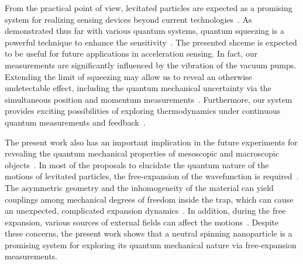 \documentclass[aps, prl, 
amsmath, showpacs, preprintnumbers, twocolumn, amssymb, amsmath, superscriptaddress]{revtex4-1}
\begin{document}
From the practical point of view, levitated particles are expected as a promising system for realizing sensing devices beyond current technologies~\cite{monteiro2020force}. As demonstrated thus far with various quantum systems, quantum squeezing is a powerful technique to enhance the sensitivity~\cite{ma2011quantum,toth2014quantum,braun2018quantum,barzanjeh2022optomechanics}. The presented shceme is expected to be useful for future applications in acceleration sensing. In fact, our measurements are significantly influenced by the vibration of the vacuum pumps. Extending the limit of squeezing may allow us to reveal an otherwise undetectable effect, including the quantum mechanical uncertainty via the simultaneous position and momentum measurements~\cite{arthurs1965bstj,yamamoto1986preparation,arthurs1988quantum}. Furthermore, our system provides exciting possibilities of exploring thermodynamics under continuous quantum measurements and feedback~\cite{doherty2012quantum,yada2022quantum}.



The present work also has an important implication in the future experiments for revealing the quantum mechanical properties of mesoscopic and macroscopic objects~\cite{romero2011quantum,bassi2013models}. In most of the proposals to elucidate the quantum nature of the motions of levitated particles, the free-expansion of the wavefunction is required~\cite{romero2011optically,stickler2018probing}. The asymmetric geometry and the inhomogeneity of the material can yield couplings among mechanical degrees of freedom inside the trap, which can cause an unexpected, complicated expansion dynamics~\cite{kamba2023revealing}. In addition, during the free expansion, various sources of external fields can affect the motions~\cite{hebestreit2018sensing,rossi2024quantum}. Despite these concerns, the present work shows that a neutral spinning nanoparticle is a promising system for exploring its quantum mechanical nature via free-expansion measurements.
\end{document}

